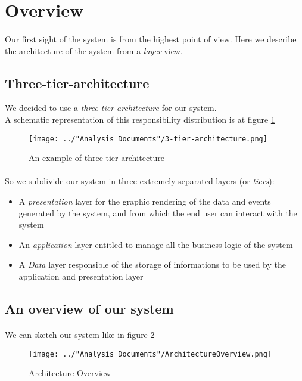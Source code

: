 \section{Overview}
\paragraph{}Our first sight of the system is from the highest point of view. Here we describe the architecture of the system from a \textit{layer} view.

\subsection{Three-tier-architecture}
We decided to use a \textit{three-tier-architecture} for our system.\\
A schematic representation of this responsibility distribution is at figure \ref{fig:3-tier-architecture}

\begin{figure}[H]
	\centering
	\texttt{[image: ../"Analysis Documents"/3-tier-architecture.png]}
	\label{fig:3-tier-architecture}
	\caption{An example of three-tier-architecture}
\end{figure}
\paragraph{} So we subdivide our system in three extremely separated layers (or \textit{tiers}):
\begin{itemize}
	\item A \textit{presentation} layer for the graphic rendering of the data and events generated by the system, and from which the end user can interact with the system
	\item An \textit{application} layer entitled to manage all the business logic of the system
	\item A \textit{Data} layer responsible of the storage of informations to be used by the application and presentation layer
\end{itemize}

\subsection{An overview of our system}
\paragraph{}We can sketch our system like in figure \ref{fig:architectureOverview}
\begin{figure}
	\centering
	\texttt{[image: ../"Analysis Documents"/ArchitectureOverview.png]}
	\label{fig:architectureOverview}
	\caption{Architecture Overview}
\end{figure}